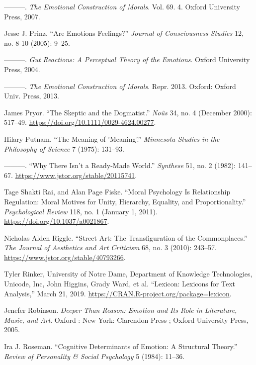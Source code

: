 \documentclass[phdthesis,12pt,final,a4paper]{wuthesis}
\newlength{\cslhangindent}
\newenvironment{CSLReferences}[2] %
{\begin{list}{}{%
	\setlength{\itemindent}{0pt}
	\setlength{\leftmargin}{0pt}
	\setlength{\parsep}{0pt}
	\ifodd #1
	\setlength{\leftmargin}{\cslhangindent}
	\setlength{\itemindent}{-1\cslhangindent}
	\fi
	\setlength{\itemsep}{#2\baselineskip}}}
{\end{list}}
\theoremstyle{definition}
\theoremstyle{definition}
\theoremstyle{definition}
\theoremstyle{definition}
\theoremstyle{remark}
\begin{document}
\begin{CSLReferences}{1}{0}
---------. \emph{The {Emotional Construction} of {Morals}}. Vol. 69. 4. Oxford University Press, 2007.

Jesse J. Prinz. {``Are Emotions Feelings?''} \emph{Journal of Consciousness Studies} 12, no. 8-10 (2005): 9--25.

---------. \emph{Gut {Reactions}: {A Perceptual Theory} of the {Emotions}}. Oxford University Press, 2004.

---------. \emph{The {Emotional Construction} of {Morals}}. Repr. 2013. Oxford: Oxford Univ. Press, 2013.

James Pryor. {``The {Skeptic} and the {Dogmatist}.''} \emph{Noûs} 34, no. 4 (December 2000): 517--49. \url{https://doi.org/10.1111/0029-4624.00277}.

Hilary Putnam. {``The {Meaning} of '{Meaning}'.''} \emph{Minnesota Studies in the Philosophy of Science} 7 (1975): 131--93.

---------. {``Why {There Isn}'t a {Ready-Made World}.''} \emph{Synthese} 51, no. 2 (1982): 141--67. \url{https://www.jstor.org/stable/20115741}.

Tage Shakti Rai, and Alan Page Fiske. {``Moral Psychology Is Relationship Regulation: Moral Motives for Unity, Hierarchy, Equality, and Proportionality.''} \emph{Psychological Review} 118, no. 1 (January 1, 2011). \url{https://doi.org/10.1037/a0021867}.

Nicholas Alden Riggle. {``Street {Art}: {The Transfiguration} of the {Commonplaces}.''} \emph{The Journal of Aesthetics and Art Criticism} 68, no. 3 (2010): 243--57. \url{https://www.jstor.org/stable/40793266}.

Tyler Rinker, University of Notre Dame, Department of Knowledge Technologies, Unicode, Inc, John Higgins, Grady Ward, et al. {``Lexicon: {Lexicons} for {Text Analysis},''} March 21, 2019. \url{https://CRAN.R-project.org/package=lexicon}.

Jenefer Robinson. \emph{Deeper Than Reason: Emotion and Its Role in Literature, Music, and Art}. Oxford : New York: Clarendon Press ; Oxford University Press, 2005.

Ira J. Roseman. {``Cognitive Determinants of Emotion: {A} Structural Theory.''} \emph{Review of Personality \& Social Psychology} 5 (1984): 11--36.


\end{CSLReferences}
\end{document}
